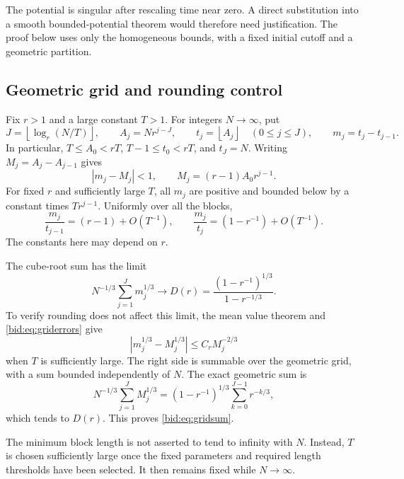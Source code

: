 \documentclass[11pt,letterpaper]{article}
\numberwithin{equation}{section}
\theoremstyle{remark}\newtheorem{remark}[theorem]{Remark}
\newcommand{\floor}[1]{\left\lfloor #1\right\rfloor}
\begin{document}
The potential is singular after rescaling time near zero. A direct
substitution into a smooth bounded-potential theorem would therefore
need justification. The proof below uses only the homogeneous bounds,
with a fixed initial cutoff and a geometric partition.

\subsection{Geometric grid and rounding control}
Fix $r>1$ and a large constant $T>1$. For integers $N\to\infty$, put
\begin{equation}\label{bid:eq:grid}
 J=\floor{\log_r(N/T)},\qquad
 A_j=Nr^{j-J},\qquad t_j=\floor{A_j}\quad(0\leq j\leq J),
 \qquad m_j=t_j-t_{j-1}.
\end{equation}
In particular, $T\leq A_0<rT$, $T-1\leq t_0<rT$, and $t_J=N$.
Writing $M_j=A_j-A_{j-1}$ gives
\begin{equation}\label{bid:eq:griderrors}
 |m_j-M_j|<1,\qquad M_j=(r-1)A_0r^{j-1}.
\end{equation}
For fixed $r$ and sufficiently large $T$, all $m_j$ are positive and
bounded below by a constant times $Tr^{j-1}$. Uniformly over all the
blocks,
\begin{equation}\label{bid:eq:gridratios}
 \frac{m_j}{t_{j-1}}=(r-1)+O(T^{-1}),\qquad
 \frac{m_j}{t_j}=(1-r^{-1})+O(T^{-1}).
\end{equation}
The constants here may depend on $r$.

The cube-root sum has the limit
\begin{equation}\label{bid:eq:gridsum}
 N^{-1/3}\sum_{j=1}^Jm_j^{1/3}\longrightarrow
 D(r)=\frac{(1-r^{-1})^{1/3}}{1-r^{-1/3}}.
\end{equation}
To verify rounding does not affect this limit, the mean value theorem
and \eqref{bid:eq:griderrors} give
\[
 |m_j^{1/3}-M_j^{1/3}|\leq C_rM_j^{-2/3}
\]
when $T$ is sufficiently large. The right side is summable over the
geometric grid, with a sum bounded independently of $N$. The exact
geometric sum is
\[
 N^{-1/3}\sum_{j=1}^JM_j^{1/3}
 =(1-r^{-1})^{1/3}\sum_{k=0}^{J-1}r^{-k/3},
\]
which tends to $D(r)$. This proves \eqref{bid:eq:gridsum}.

The minimum block length is not asserted to tend to infinity with $N$.
Instead, $T$ is chosen sufficiently large once the fixed parameters and
required length thresholds have been selected. It then remains fixed
while $N\to\infty$.
\end{document}
